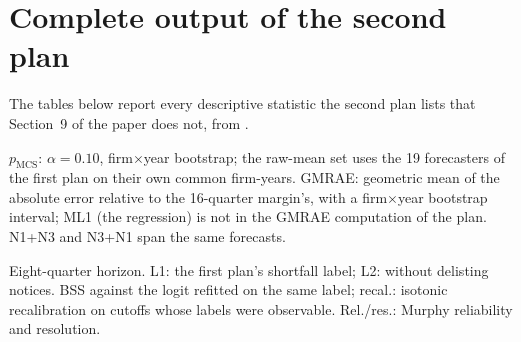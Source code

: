\clearpage
\section{Complete output of the second plan}\label{app:plan4}
The tables below report every descriptive statistic the second plan lists that Section~9 of the paper does not, from .

\begin{table}[!htbp]
\centering\scriptsize
\caption{Model confidence sets with the regression added, and scale-free errors (operating cash flow)}
\label{tab:rev4mcs}

\par\smallskip
\begin{minipage}{\linewidth}\footnotesize
$p_{\mathrm{MCS}}$: $\alpha=0.10$, firm$\times$year bootstrap; the raw-mean set uses the 19 forecasters of the first plan on their own common firm-years. GMRAE: geometric mean of the absolute error relative to the 16-quarter margin's, with a firm$\times$year bootstrap interval; ML1 (the regression) is not in the GMRAE computation of the plan. N1+N3 and N3+N1 span the same forecasts.
\end{minipage}
\end{table}

\begin{table}[!htbp]
\centering\scriptsize
\caption{Shortfall probabilities: every cell of the second plan}
\label{tab:rev4short}
\resizebox{\linewidth}{!}{}
\par\smallskip
\begin{minipage}{\linewidth}\footnotesize
Eight-quarter horizon. L1: the first plan's shortfall label; L2: without delisting notices. BSS against the logit refitted on the same label; recal.: isotonic recalibration on cutoffs whose labels were observable. Rel./res.: Murphy reliability and resolution.
\end{minipage}
\end{table}

\begin{table}[!htbp]
\centering\scriptsize
\caption{Further statistics of the second plan}
\label{tab:rev4misc}
\resizebox{\linewidth}{!}{}
\end{table}
